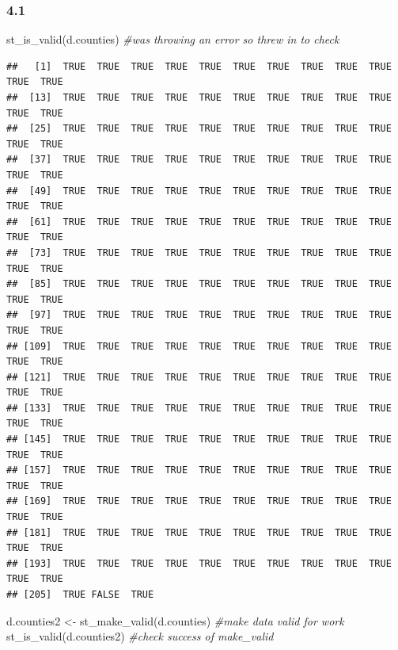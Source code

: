 \documentclass[
]{article}
\newenvironment{Shaded}{\begin{snugshade}}{\end{snugshade}}
\newcommand{\CommentTok}[1]{\textcolor[rgb]{0.56,0.35,0.01}{\textit{#1}}}
\newcommand{\FunctionTok}[1]{\textcolor[rgb]{0.00,0.00,0.00}{#1}}
\newcommand{\NormalTok}[1]{#1}
\newcommand{\OtherTok}[1]{\textcolor[rgb]{0.56,0.35,0.01}{#1}}
\begin{document}
\hypertarget{section-8}{%
\subsubsection{4.1}\label{section-8}}

\begin{Shaded}
\begin{Highlighting}[]
\FunctionTok{st\_is\_valid}\NormalTok{(d.counties) }\CommentTok{\#was throwing an error so threw in to check}
\end{Highlighting}
\end{Shaded}

\begin{verbatim}
##   [1]  TRUE  TRUE  TRUE  TRUE  TRUE  TRUE  TRUE  TRUE  TRUE  TRUE  TRUE  TRUE
##  [13]  TRUE  TRUE  TRUE  TRUE  TRUE  TRUE  TRUE  TRUE  TRUE  TRUE  TRUE  TRUE
##  [25]  TRUE  TRUE  TRUE  TRUE  TRUE  TRUE  TRUE  TRUE  TRUE  TRUE  TRUE  TRUE
##  [37]  TRUE  TRUE  TRUE  TRUE  TRUE  TRUE  TRUE  TRUE  TRUE  TRUE  TRUE  TRUE
##  [49]  TRUE  TRUE  TRUE  TRUE  TRUE  TRUE  TRUE  TRUE  TRUE  TRUE  TRUE  TRUE
##  [61]  TRUE  TRUE  TRUE  TRUE  TRUE  TRUE  TRUE  TRUE  TRUE  TRUE  TRUE  TRUE
##  [73]  TRUE  TRUE  TRUE  TRUE  TRUE  TRUE  TRUE  TRUE  TRUE  TRUE  TRUE  TRUE
##  [85]  TRUE  TRUE  TRUE  TRUE  TRUE  TRUE  TRUE  TRUE  TRUE  TRUE  TRUE  TRUE
##  [97]  TRUE  TRUE  TRUE  TRUE  TRUE  TRUE  TRUE  TRUE  TRUE  TRUE  TRUE  TRUE
## [109]  TRUE  TRUE  TRUE  TRUE  TRUE  TRUE  TRUE  TRUE  TRUE  TRUE  TRUE  TRUE
## [121]  TRUE  TRUE  TRUE  TRUE  TRUE  TRUE  TRUE  TRUE  TRUE  TRUE  TRUE  TRUE
## [133]  TRUE  TRUE  TRUE  TRUE  TRUE  TRUE  TRUE  TRUE  TRUE  TRUE  TRUE  TRUE
## [145]  TRUE  TRUE  TRUE  TRUE  TRUE  TRUE  TRUE  TRUE  TRUE  TRUE  TRUE  TRUE
## [157]  TRUE  TRUE  TRUE  TRUE  TRUE  TRUE  TRUE  TRUE  TRUE  TRUE  TRUE  TRUE
## [169]  TRUE  TRUE  TRUE  TRUE  TRUE  TRUE  TRUE  TRUE  TRUE  TRUE  TRUE  TRUE
## [181]  TRUE  TRUE  TRUE  TRUE  TRUE  TRUE  TRUE  TRUE  TRUE  TRUE  TRUE  TRUE
## [193]  TRUE  TRUE  TRUE  TRUE  TRUE  TRUE  TRUE  TRUE  TRUE  TRUE  TRUE  TRUE
## [205]  TRUE FALSE  TRUE
\end{verbatim}

\begin{Shaded}
\begin{Highlighting}[]
\NormalTok{d.counties2 }\OtherTok{\textless{}{-}} \FunctionTok{st\_make\_valid}\NormalTok{(d.counties) }\CommentTok{\#make data valid for work}
\FunctionTok{st\_is\_valid}\NormalTok{(d.counties2) }\CommentTok{\#check success of make\_valid}
\end{Highlighting}
\end{Shaded}
\end{document}
